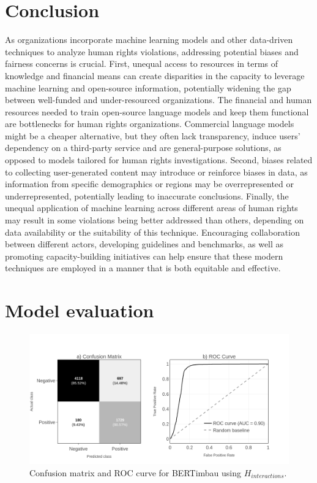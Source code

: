 \documentclass[11pt,letterpaper]{article}
\begin{document}
\section{Conclusion}
\label{chap:conclusion}

As organizations incorporate machine learning models and other data-driven techniques to analyze human rights violations, addressing potential biases and fairness concerns is crucial. First, unequal access to resources in terms of knowledge and financial means can create disparities in the capacity to leverage machine learning and open-source information, potentially widening the gap between well-funded and under-resourced organizations. The financial and human resources needed to train open-source language models and keep them functional are bottlenecks for human rights organizations. Commercial language models might be a cheaper alternative, but they often lack transparency, induce users' dependency on a third-party service and are general-purpose solutions, as opposed to models tailored for human rights investigations. Second, biases related to collecting user-generated content may introduce or reinforce biases in data, as information from specific demographics or regions may be overrepresented or underrepresented, potentially leading to inaccurate conclusions. Finally, the unequal application of machine learning across different areas of human rights may result in some violations being better addressed than others, depending on data availability or the suitability of this technique. Encouraging collaboration between different actors, developing guidelines and benchmarks, as well as promoting capacity-building initiatives can help ensure that these modern techniques are employed in a manner that is both equitable and effective.



\newpage
\appendix
\section{Model evaluation}
\label{app:model_evaluation}

\begin{figure}[H]
    \centering
    \includegraphics[width=0.7\linewidth]{figs/test_interactions_pb.png}
    \caption{Confusion matrix and ROC curve for BERTimbau using $H_{interactions}$.}
    \label{fig:eval-interactions}
\end{figure}
\end{document}
